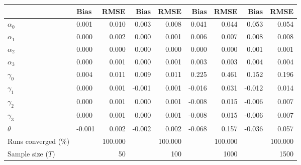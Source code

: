
\begin{tabular}[t]{llrrrrrrr}
\toprule
  & Bias & RMSE & Bias & RMSE & Bias & RMSE & Bias & RMSE\\
\midrule
$\alpha_{0}$ & 0.001 & 0.010 & 0.003 & 0.008 & 0.041 & 0.044 & 0.053 & 0.054\\
$\alpha_{1}$ & 0.000 & 0.002 & 0.000 & 0.001 & 0.006 & 0.007 & 0.008 & 0.008\\
$\alpha_{2}$ & 0.000 & 0.000 & 0.000 & 0.000 & 0.000 & 0.000 & 0.001 & 0.001\\
$\alpha_{3}$ & 0.000 & 0.001 & 0.000 & 0.001 & 0.003 & 0.003 & 0.004 & 0.004\\
$\gamma_{0}$ & 0.004 & 0.011 & 0.009 & 0.011 & 0.225 & 0.461 & 0.152 & 0.196\\
$\gamma_{1}$ & 0.000 & 0.001 & -0.001 & 0.001 & -0.016 & 0.031 & -0.012 & 0.014\\
$\gamma_{2}$ & 0.000 & 0.001 & 0.000 & 0.001 & -0.008 & 0.015 & -0.006 & 0.007\\
$\gamma_{3}$ & 0.000 & 0.001 & 0.000 & 0.001 & -0.008 & 0.015 & -0.006 & 0.007\\
$\theta$ & -0.001 & 0.002 & -0.002 & 0.002 & -0.068 & 0.157 & -0.036 & 0.057\\
Runs converged (\%) &  & 100.000 &  & 100.000 &  & 100.000 &  & 100.000\\
Sample size ($T$) &  & 50 &  & 100 &  & 1000 &  & 1500\\
\bottomrule
\end{tabular}
